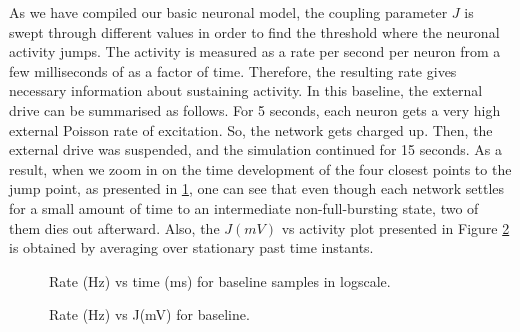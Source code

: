 \documentclass[a4paper,12pt]{article}
\begin{document}
As we have compiled our basic neuronal model, the coupling parameter $J$ is swept through different values in order to find the threshold where the neuronal activity jumps. The activity is measured as a rate per second per neuron from a few milliseconds of as a factor of time. Therefore, the resulting rate gives necessary information about sustaining activity. In this baseline, the external drive can be summarised as follows. For 5 seconds, each neuron gets a very high external Poisson rate of excitation. So, the network gets charged up. Then, the external drive was suspended, and the simulation continued for 15 seconds. As a result, when we zoom in on the time development of the four closest points to the jump point, as presented in \ref{ratevstime}, one can see that even though each network settles for a small amount of time to an intermediate non-full-bursting state, two of them dies out afterward. Also, the $J(mV)$ vs activity plot presented in Figure \ref{jvsactivity} is obtained by averaging over stationary past time instants. 

\begin{figure}[H] 
    \caption{Rate (Hz) vs time (ms) for baseline samples in logscale.}
    \label{ratevstime}
\end{figure}
\begin{figure}[H] 
    \caption{Rate (Hz) vs J(mV) for baseline.}
    \label{jvsactivity}
\end{figure}
\end{document}
